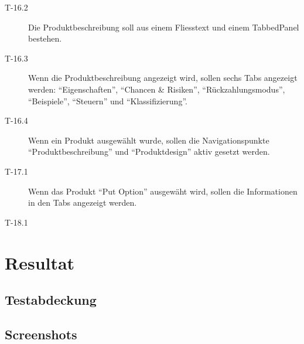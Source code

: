 \begin{description}
\item[T-16.2\label{itm:T-16.2}]
Die Produktbeschreibung soll aus einem Fliesstext und einem TabbedPanel
bestehen.

\item[T-16.3\label{itm:T-16.3}]
Wenn die Produktbeschreibung angezeigt wird, sollen sechs Tabs angezeigt
werden: ``Eigenschaften'', ``Chancen \& Risiken'', ``Rückzahlungsmodus'',
``Beispiele'', ``Steuern'' und ``Klassifizierung''.

\item[T-16.4\label{itm:T-16.4}]
Wenn ein Produkt ausgewählt wurde, sollen die Navigationspunkte
``Produktbeschreibung'' und ``Produktdesign'' aktiv gesetzt werden.

\item[T-17.1\label{itm:T-17.1}]
Wenn das Produkt ``Put Option'' ausgewäht wird, sollen die Informationen in den
Tabs angezeigt werden.

\item[T-18.1\label{img:T-18.1}]

\end{description}

\section{Resultat}

\subsection{Testabdeckung}

\subsection{Screenshots}